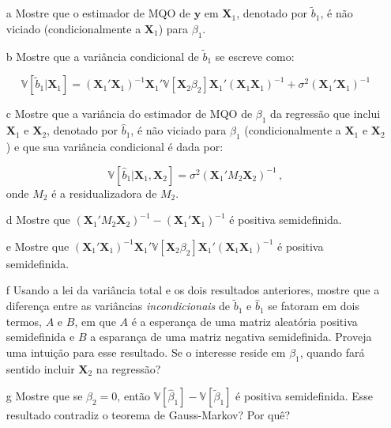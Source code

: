 \documentclass[10pt,a4paper]{article}
\begin{document}
 \begin{itemize}
 	\item[a] Mostre que o estimador de MQO de $\boldsymbol{y}$ em $\boldsymbol{X}_1$, denotado por $\tilde{b}_1$, é não viciado (condicionalmente a $\boldsymbol{X}_1$) para $\beta_1$.
 	\item[b] Mostre que a variância condicional de $\tilde{b}_1$ se escreve como:
 	
 	$$\mathbb{V}[\tilde{b}_1|\boldsymbol{X}_1] = 	(\boldsymbol{X}_1'\boldsymbol{X}_1)^{-1}\boldsymbol{X}_1'\mathbb{V}[\boldsymbol{X}_2\beta_2]\boldsymbol{X}_1'(\boldsymbol{X}_1\boldsymbol{X}_1)^{-1} + \sigma^2 (\boldsymbol{X}_1'\boldsymbol{X}_1)^{-1}$$
 	
 	\item[c] Mostre que a variância do estimador de MQO de $\beta_1$ da regressão que inclui $\boldsymbol{X}_1$ e $\boldsymbol{X}_2$, denotado por $\hat{b}_1$, é não viciado para $\beta_1$ (condicionalmente a $\boldsymbol{X}_1$ e $\boldsymbol{X}_2$) e que sua variância condicional é dada por:
 	
 	$$\mathbb{V}[\hat{b}_1|\boldsymbol{X}_1,\boldsymbol{X}_2] = \sigma^2\left(\boldsymbol{X}_1'M_2 \boldsymbol{X}_2\right)^{-1}\, , $$
 	onde $M_2$ é a residualizadora de $M_2$.
 	
 	\item[d] Mostre que $\left(\boldsymbol{X}_1'M_2 \boldsymbol{X}_2\right)^{-1} - (\boldsymbol{X}_1'\boldsymbol{X}_1)^{-1}$ é positiva semidefinida.
 	
 	\item[e] Mostre que $(\boldsymbol{X}_1'\boldsymbol{X}_1)^{-1}\boldsymbol{X}_1'\mathbb{V}[\boldsymbol{X}_2\beta_2]\boldsymbol{X}_1'(\boldsymbol{X}_1\boldsymbol{X}_1)^{-1} $ é positiva semidefinida.
 	
 	\item[f] Usando a  lei da variância total e os dois resultados anteriores, mostre que a diferença entre as variâncias \emph{incondicionais} de $\tilde{b}_1$ e $\hat{b}_1$ se fatoram em dois termos, $A$ e $B$, em que $A$ é a esperança de uma matriz aleatória positiva semidefinida e $B$ a esparança de uma matriz negativa semidefinida. Proveja uma intuição para esse resultado. Se o interesse reside em $\beta_1$, quando fará sentido incluir $\boldsymbol{X}_2$ na regressão?
 	\item[g] Mostre que se $\beta_2 = 0$, então  $\mathbb{V}[\hat{\beta}_1] - \mathbb{V}[\tilde{\beta}_1] $ é positiva semidefinida. Esse resultado contradiz o teorema de Gauss-Markov? Por quê?
 \end{itemize}
 
\end{document}
